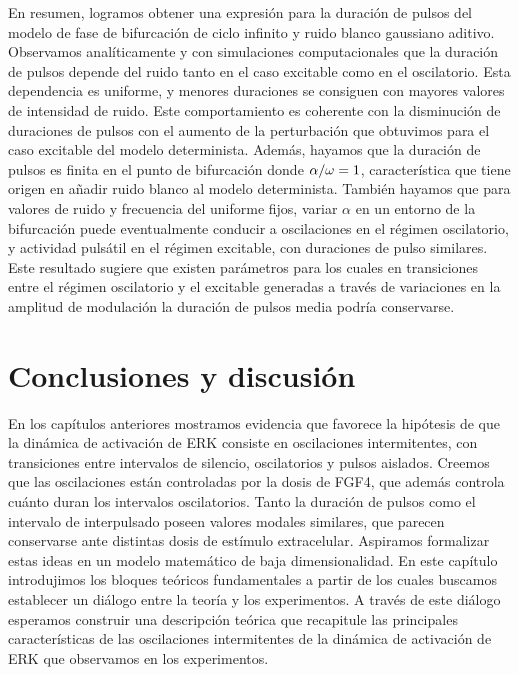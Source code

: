 \documentclass[./main.tex]{subfiles}
\begin{document}
En resumen, logramos obtener una expresión para la duración de pulsos del modelo de fase de bifurcación de ciclo infinito y ruido blanco gaussiano aditivo. Observamos analíticamente y con simulaciones computacionales que la duración de pulsos depende del ruido tanto en el caso excitable como en el oscilatorio. Esta dependencia es uniforme, y menores duraciones se consiguen con mayores valores de intensidad de ruido. Este comportamiento es coherente con la disminución de duraciones de pulsos con el aumento de la perturbación que obtuvimos para el caso excitable del modelo determinista. Además, hayamos que la duración de pulsos es finita en el punto de bifurcación donde $\alpha/\omega = 1$, característica que tiene origen en añadir ruido blanco al modelo determinista. También hayamos que para valores de ruido y frecuencia del uniforme fijos, variar $\alpha$ en un entorno de la bifurcación puede eventualmente conducir a oscilaciones en el régimen oscilatorio, y actividad pulsátil en el régimen excitable, con duraciones de pulso similares. Este resultado sugiere que existen parámetros para los cuales en transiciones entre el régimen oscilatorio y el excitable generadas a través de variaciones en la amplitud de modulación la duración de pulsos media podría conservarse. 


\section{Conclusiones y discusión}

En los capítulos anteriores mostramos evidencia que favorece la hipótesis de que la dinámica de activación de ERK consiste en oscilaciones intermitentes, con transiciones entre intervalos de silencio, oscilatorios y pulsos aislados. Creemos que las oscilaciones están controladas por la dosis de FGF4, que además controla cuánto duran los intervalos oscilatorios. Tanto la duración de pulsos como el intervalo de interpulsado poseen valores modales similares, que parecen conservarse ante distintas dosis de estímulo extracelular. Aspiramos formalizar estas ideas en un modelo matemático de baja dimensionalidad. En este capítulo introdujimos los bloques teóricos fundamentales a partir de los cuales buscamos establecer un diálogo entre la teoría y los experimentos. A través de este diálogo esperamos construir una descripción teórica que recapitule las principales características de las oscilaciones intermitentes de la dinámica de activación de ERK que observamos en los experimentos. 
\end{document}
